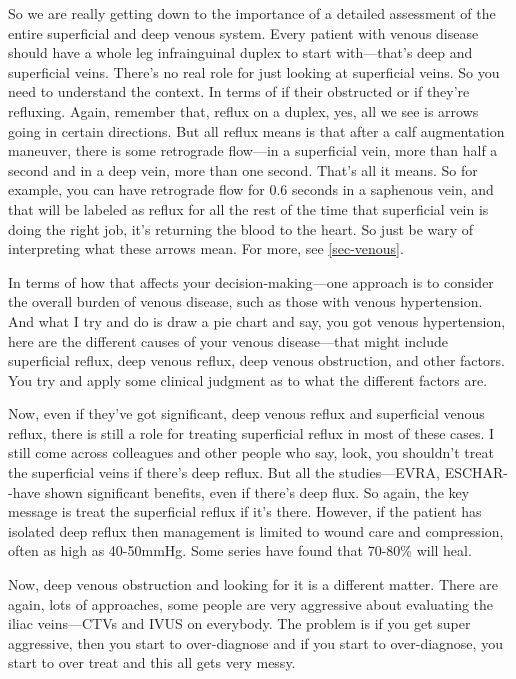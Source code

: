 \documentclass[
]{book}
\begin{document}
So we are really getting down to the importance of a detailed assessment
of the entire superficial and deep venous system. Every patient with
venous disease should have a whole leg infrainguinal duplex to start
with---that's deep and superficial veins. There's no real role for just
looking at superficial veins. So you need to understand the context. In
terms of if their obstructed or if they're refluxing. Again, remember
that, reflux on a duplex, yes, all we see is arrows going in certain
directions. But all reflux means is that after a calf augmentation
maneuver, there is some retrograde flow---in a superficial vein, more
than half a second and in a deep vein, more than one second. That's all
it means. So for example, you can have retrograde flow for 0.6 seconds
in a saphenous vein, and that will be labeled as reflux for all the rest
of the time that superficial vein is doing the right job, it's returning
the blood to the heart. So just be wary of interpreting what these
arrows mean. For more, see \ref{sec-venous}.

In terms of how that affects your decision-making---one approach is to
consider the overall burden of venous disease, such as those with venous
hypertension. And what I try and do is draw a pie chart and say, you got
venous hypertension, here are the different causes of your venous
disease---that might include superficial reflux, deep venous reflux,
deep venous obstruction, and other factors. You try and apply some
clinical judgment as to what the different factors are.

Now, even if they've got significant, deep venous reflux and superficial
venous reflux, there is still a role for treating superficial reflux in
most of these cases. I still come across colleagues and other people who
say, look, you shouldn't treat the superficial veins if there's deep
reflux. But all the studies---EVRA, ESCHAR-\/-have shown significant
benefits, even if there's deep flux.\citep{gohel2007, gohel2018} So again,
the key message is treat the superficial reflux if it's there. However,
if the patient has isolated deep reflux then management is limited to
wound care and compression, often as high as 40-50mmHg. Some series have
found that 70-80\% will heal.\citep{odonnell2014, maleti2011}

Now, deep venous obstruction and looking for it is a different matter.
There are again, lots of approaches, some people are very aggressive
about evaluating the iliac veins---CTVs and IVUS on everybody. The
problem is if you get super aggressive, then you start to over-diagnose
and if you start to over-diagnose, you start to over treat and this all
gets very messy.
\end{document}
